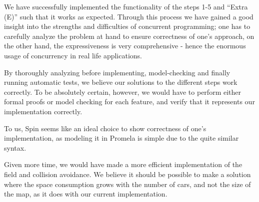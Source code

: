 
We have successfully implemented the functionality of the steps 1-5 and ``Extra (E)'' such that it works as expected. Through this process we have gained a good insight into the strengths and difficulties of concurrent programming; one has to carefully analyze the problem at hand to ensure correctness of one's approach, on the other hand, the expressiveness is very comprehensive - hence the enormous usage of concurrency in real life applications.

By thoroughly analyzing before implementing, model-checking and finally running automatic tests, we believe our solutions to the different steps work correctly. To be absolutely certain, however, we would have to perform either formal proofs or model checking for each feature, and verify that it represents our implementation correctly. 

To us, Spin seems like an ideal choice to show correctness of one's implementation, as modeling it in Promela is simple due to the quite similar syntax.

Given more time, we would have made a more efficient implementation of the field and collision avoidance. We believe it should be possible to make a solution where the space consumption grows with the number of cars, and not the size of the map, as it does with our current implementation.